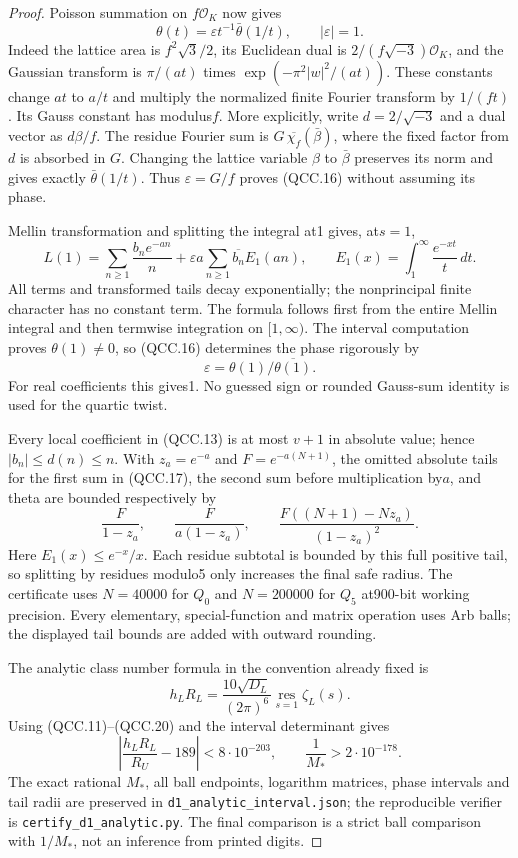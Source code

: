 \begin{proof}
Poisson summation on $f\mathcal O_K$ now gives
\[
                \theta(t)=\varepsilon t^{-1}\bar\theta(1/t),
                         \qquad |\varepsilon|=1.
 \tag{QCC.16}
\]
Indeed the lattice area is $f^2\sqrt3/2$, its Euclidean dual is
$2/(f\sqrt{-3})\mathcal O_K$, and the Gaussian transform is
$\pi/(at)$ times $\exp(-\pi^2|w|^2/(at))$.  These constants change
$a t$ to $a/t$ and multiply the normalized finite Fourier transform
by $1/(ft)$.  Its Gauss constant has modulus$f$.  More explicitly, write
$d=2/\sqrt{-3}$ and a dual vector as $d\beta/f$.
The residue Fourier sum is $G\,\overline{\chi_f}(\bar\beta)$,
where the fixed factor from $d$ is absorbed in $G$.
Changing the lattice variable $\beta$ to $\bar\beta$ preserves
its norm and gives exactly $\bar\theta(1/t)$.
Thus $\varepsilon=G/f$ proves (QCC.16) without assuming its phase.

Mellin transformation and splitting the integral at1 gives, at$s=1$,
\[
 L(1)=\sum_{n\ge1}\frac{b_n e^{-an}}n
       +\varepsilon a\sum_{n\ge1}\overline{b_n}E_1(an),\qquad
 E_1(x)=\int_1^\infty\frac{e^{-xt}}t\,dt.
 \tag{QCC.17}
\]
All terms and transformed tails decay exponentially; the nonprincipal
finite character has no constant term.  The formula follows first
from the entire Mellin integral and then termwise integration on
$[1,\infty)$.  The interval computation proves $\theta(1)\ne0$,
so (QCC.16) determines the phase rigorously by
\[
                    \varepsilon=\theta(1)/\overline{\theta(1)}.
 \tag{QCC.18}
\]
For real coefficients this gives1.  No guessed sign or rounded
Gauss-sum identity is used for the quartic twist.

Every local coefficient in (QCC.13) is at most $v+1$ in absolute value;
hence $|b_n|\le d(n)\le n$.  With $z_a=e^{-a}$ and
$F=e^{-a(N+1)}$, the omitted absolute tails for the first sum in
(QCC.17), the second sum before multiplication by$a$, and theta are
bounded respectively by
\[
 \frac F{1-z_a},\qquad
 \frac F{a(1-z_a)},\qquad
 \frac{F((N+1)-Nz_a)}{(1-z_a)^2}.
 \tag{QCC.19}
\]
Here $E_1(x)\le e^{-x}/x$.  Each residue subtotal is bounded by
this full positive tail, so splitting by residues modulo5 only
increases the final safe radius.  The certificate uses $N=40000$
for $Q_0$ and $N=200000$ for $Q_5$ at900-bit working precision.
Every elementary, special-function and matrix operation uses Arb
balls; the displayed tail bounds are added with outward rounding.

The analytic class number formula in the convention already fixed is
\[
 h_L R_L=\frac{10\sqrt{D_L}}{(2\pi)^6}
                       \operatorname*{res}_{s=1}\zeta_L(s).
 \tag{QCC.20}
\]
Using (QCC.11)--(QCC.20) and the interval determinant gives
\[
 \left|\frac{h_LR_L}{R_U}-189\right|<8\cdot10^{-203},
 \qquad
 \frac1{M_*}>2\cdot10^{-178}.
 \tag{QCC.21}
\]
The exact rational $M_*$, all ball endpoints, logarithm matrices,
phase intervals and tail radii are preserved in
\texttt{d1\_analytic\_interval.json}; the reproducible verifier is
\texttt{certify\_d1\_analytic.py}.  The final comparison is a strict
ball comparison with $1/M_*$, not an inference from printed digits.


\end{proof}
